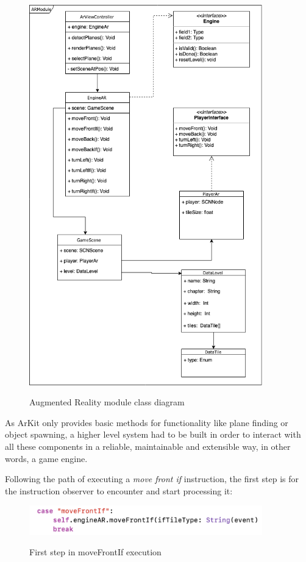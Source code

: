 \documentclass[12 pct]{report}
\begin{document}
\begin{figure}[H]
\includegraphics[width=0.9\textwidth]{ArRobotCodeUML}
\centering
\label{fig:feature-points}
\caption{ Augmented Reality module class diagram }
\end{figure}

As ArKit only provides basic methods for functionality like plane finding or object spawning, a higher level system had to be built in order to interact with all these components in a reliable, maintainable and extensible way, in other words, a game engine.

Following the path of executing a \textit{move front if} instruction, the first step is for the instruction observer to encounter and start processing  it:
\begin{figure}[H]
\includegraphics[width=0.9\textwidth]{move-front-if-1}
\centering
\label{fig:feature-points}
\caption{ First step in moveFrontIf execution }
\end{figure}
\end{document}

